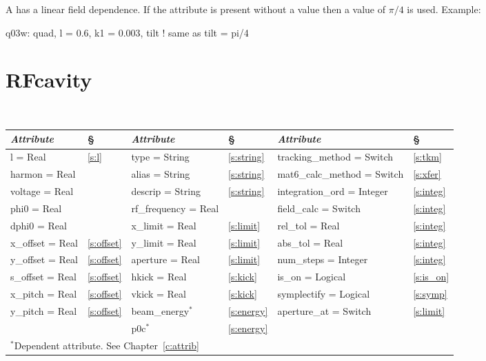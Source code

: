 {{A  has a linear field dependence.
If the  attribute is present without a value then a value of $\pi/4$
is used.
Example:
\begin{example}
  q03w: quad, l = 0.6, k1 = 0.003, tilt  ! same as tilt = pi/4
\end{example}

\section{RFcavity}
\label{s:rfcav}

\begin{center}
\tt
\begin{tabular}{|l|l||l|l||l|l|} \hline
  {\sl Attribute} & \S  & {\sl Attribute} & \S & {\sl Attribute} & \S \\ \hline
  l        = Real     & \ref{s:l}      & type = String      & \ref{s:string} & tracking\_method = Switch   & \ref{s:tkm}   \\ \hline
  harmon   = Real     &                & alias = String     & \ref{s:string} & mat6\_calc\_method = Switch & \ref{s:xfer}  \\ \hline
  voltage  = Real     &                & descrip = String   & \ref{s:string} & integration\_ord = Integer  & \ref{s:integ} \\ \hline
  phi0     = Real     &                & rf\_frequency = Real &              & field\_calc = Switch        & \ref{s:integ} \\ \hline
  dphi0    = Real     &                & x\_limit = Real    & \ref{s:limit}  & rel\_tol = Real             & \ref{s:integ} \\ \hline
  x\_offset  = Real   & \ref{s:offset} & y\_limit = Real    & \ref{s:limit}  & abs\_tol = Real             & \ref{s:integ} \\ \hline
  y\_offset  = Real   & \ref{s:offset} & aperture = Real    & \ref{s:limit}  & num\_steps = Integer        & \ref{s:integ} \\ \hline
  s\_offset  = Real   & \ref{s:offset} & hkick    = Real    & \ref{s:kick}   & is\_on = Logical            & \ref{s:is_on} \\ \hline
  x\_pitch = Real     & \ref{s:offset} & vkick    = Real    & \ref{s:kick}   & symplectify = Logical       & \ref{s:symp}  \\ \hline
  y\_pitch = Real     & \ref{s:offset} & beam\_energy$^*$   & \ref{s:energy} & aperture\_at = Switch       & \ref{s:limit} \\ \hline
                      &                & p0c$^*$            & \ref{s:energy} &                             &               \\ \hline
  \multicolumn{6}{l}{\small $^*$Dependent attribute. See Chapter~\ref{c:attrib}} \\
\end{tabular}
\end{center}
\toffset

}}
